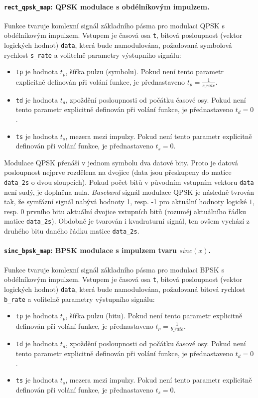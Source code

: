 \paragraph{\texttt{rect\_qpsk\_map}: QPSK modulace s obdélníkovým impulzem.}
Funkce tvaruje komlexní signál základního pásma pro modulaci QPSK s obdélníkovým impulzem. 
Vstupem je časová osa \texttt{t}, bitová posloupnost (vektor logických hodnot) \texttt{data}, která bude namodulována, požadovaná symbolová rychlost \texttt{s\_rate} a volitelně parametry výstupního signálu:
\begin{itemize}
\item \texttt{tp} je hodnota $t_p$, šířka pulzu (symbolu). Pokud není tento parametr explicitně definován při volání funkce, je přednastaveno $t_p = \frac{1}{s\_rate}$.
\item \texttt{td} je hodnota $t_d$, zpoždění posloupnosti od počátku časové osy. Pokud není tento parametr explicitně definován při volání funkce, je přednastaveno $t_d = 0$.
\item \texttt{ts} je hodnota $t_s$, mezera mezi impulzy. Pokud není tento parametr explicitně definován při volání funkce, je přednastaveno $t_s = 0$.
\end{itemize}

Modulace QPSK přenáší v jednom symbolu dva datové bity. Proto je datová posloupnost nejprve rozdělena na dvojice (data jsou přeskupeny do matice \texttt{data\_2s} o dvou sloupcích). Pokud počet bitů v původním vstupním vektoru \texttt{data} není sudý, je doplněna nula. \textsl{Baseband} signál modulace QPSK je následně tvrován tak, že symfázní signál nabývá hodnoty 1, resp. -1 pro aktuální hodnoty logické $1$, resp. $0$ prvního bitu aktuální dvojice vstupních bitů (rozuměj aktuálního řádku matice \texttt{data\_2s}). Obdobně je tvarován i kvadraturní signál, ten ovšem vychází z druhého bitu daného řádku matice \texttt{data\_2s}.

\paragraph{\texttt{sinc\_bpsk\_map}: BPSK modulace s impulzem tvaru $sinc(x)$.}
Funkce tvaruje komlexní signál základního pásma pro modulaci BPSK s obdélníkovým impulzem. 
Vstupem je časová osa \texttt{t}, bitová posloupnost (vektor logických hodnot) \texttt{data}, která bude namodulována, požadovaná bitová rychlost \texttt{b\_rate} a volitelně parametry výstupního signálu:
\begin{itemize}
\item \texttt{tp} je hodnota $t_p$, šířka pulzu (bitu). Pokud není tento parametr explicitně definován při volání funkce, je přednastaveno $t_p = \frac{1}{b\_rate}$.
\item \texttt{td} je hodnota $t_d$, zpoždění posloupnosti od počátku časové osy. Pokud není tento parametr explicitně definován při volání funkce, je přednastaveno $t_d = 0$.
\item \texttt{ts} je hodnota $t_s$, mezera mezi impulzy. Pokud není tento parametr explicitně definován při volání funkce, je přednastaveno $t_s = 0$.
\end{itemize}


